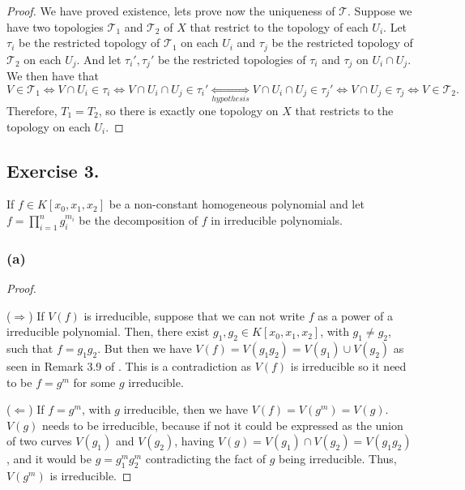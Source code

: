 \documentclass[11pt,a4paper]{article}
\begin{document}
\begin{proof}
  \vspace{1mm}
  We have proved existence, lets prove now the uniqueness of $ \mathcal T $. Suppose we have two topologies $ \mathcal T_1 $ and $ \mathcal T_2 $ of $ X $ that restrict to the topology of each $ U_i $. Let $ \tau_i $ be the restricted topology of $ \mathcal T_1 $ on each $ U_i $ and $ \tau_j $ be the restricted topology of $ \mathcal T_2 $ on each $ U_j $. And let $ \tau_i', \tau_j' $ be the restricted topologies of $ \tau_i $ and $ \tau_j $ on $ U_i \cap U_j $. We then have that 
  $$
    V \in \mathcal T_1 \Leftrightarrow V \cap U_i \in \tau_i \Leftrightarrow V \cap U_i \cap U_j \in \tau_i' \underset{hypothesis}{\Leftrightarrow} V \cap U_i \cap U_j \in \tau_j' \Leftrightarrow  V \cap U_j \in \tau_j \Leftrightarrow V \in \mathcal T_2.
  $$
  Therefore, $ T_1 = T_2 $, so there is exactly one topology on $ X $ that restricts to the topology on each $ U_i $.
\end{proof}
\subsection*{Exercise 3.}

  If $ f \in K[x_0, x_1, x_2] $ be a non-constant homogeneous polynomial and let $ f = \prod_{i=1}^n g_i^{m_i} $ be the decomposition of $ f $ in irreducible polynomials.

\subsubsection*{(a)}
  \begin{proof} \

    \vspace{1mm}
    ($\Rightarrow$)
    If $ V(f) $ is irreducible, suppose that we can not write $ f $ as a power of a irreducible polynomial. Then, there exist $ g_1, g_2 \in K[x_0, x_1, x_2] $, with $ g_1 \neq g_2 $, such that $ f = g_1 g_2 $. But then we have $ V(f) = V(g_1 g_2) = V(g_1) \cup V(g_2) $ as seen in Remark 3.9 of \cite{gath}. This is a contradiction as $ V(f) $ is irreducible so it need to be $ f = g^m $ for some $g$ irreducible.

    \vspace{1mm}
    ($\Leftarrow$)
    If $ f = g^m $, with $ g $ irreducible, then we have $ V(f) = V(g^m) = V(g) $. $ V(g) $ needs to be irreducible, because if not it could be expressed as the union of two curves $ V(g_1) $ and $ V(g_2) $, having $ V(g) = V(g_1) \cap V(g_2) = V(g_1 g_2) $, and it would be $ g =  g_1^m g_2^m $ contradicting the fact of $ g $ being irreducible. Thus, $ V(g^m) $ is irreducible.
  \end{proof}
\end{document}
